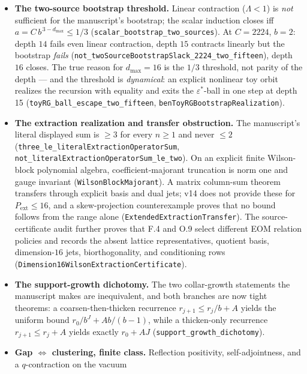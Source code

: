 \documentclass[11pt]{article}
\theoremstyle{definition}
\newcommand{\dmax}{d_{\max}}
\begin{document}
\begin{itemize}
  \item \textbf{The two-source bootstrap threshold.} Linear contraction
    ($\Lambda<1$) is \emph{not} sufficient for the manuscript's bootstrap; the
    scalar induction closes iff $a = C\,b^{\,3-\dmax} \leq 1/3$
    (\texttt{scalar\_bootstrap\_two\_sources}). At $C=2224$, $b=2$: depth $14$
    fails even linear contraction, depth $15$ contracts linearly but the
    bootstrap \emph{fails}
    (\texttt{not\_twoSourceBootstrapSlack\_2224\_two\_fifteen}), depth $16$
    closes. The true reason for $\dmax=16$ is the $1/3$ threshold, not parity of
    the depth --- and the threshold is \emph{dynamical}: an explicit nonlinear
    toy orbit realizes the recursion with equality and exits the
    $\varepsilon^{*}$-ball in one step at depth 15
    (\texttt{toyRG\_ball\_escape\_two\_fifteen},
    \texttt{benToyRGBootstrapRealization}).
  \item \textbf{The extraction realization and transfer obstruction.} The
    manuscript's literal displayed sum is $\geq 3$ for every
    $n\geq 1$ and never $\leq 2$
    (\texttt{three\_le\_literalExtractionOperatorSum},
    \texttt{not\_literalExtractionOperatorSum\_le\_two}). On an explicit
    finite Wilson-block polynomial algebra, coefficient-majorant truncation is
    norm one and gauge invariant (\texttt{WilsonBlockMajorant}). A matrix
    column-sum theorem transfers through explicit basis and dual jets; v14 does
    not provide these for $P_{\mathrm{ext}}\leq16$, and a skew-projection
    counterexample proves that no bound follows from the range alone
    (\texttt{ExtendedExtractionTransfer}). The source-certificate audit further
    proves that F.4 and O.9 select different EOM relation policies and records
    the absent lattice representatives, quotient basis, dimension-$16$ jets,
    biorthogonality, and conditioning rows
    (\texttt{Dimension16WilsonExtractionCertificate}).
  \item \textbf{The support-growth dichotomy.} The two collar-growth statements
    the manuscript makes are inequivalent, and both branches are now tight
    theorems: a coarsen-then-thicken recurrence $r_{j+1}\leq r_j/b + A$ yields
    the uniform bound $r_0/b^{J} + Ab/(b-1)$, while a thicken-only recurrence
    $r_{j+1}\leq r_j + A$ yields exactly $r_0 + AJ$
    (\texttt{support\_growth\_dichotomy}).
  \item \textbf{Gap $\Leftrightarrow$ clustering, finite class.} Reflection
    positivity, self-adjointness, and a $q$-contraction on the vacuum

\end{itemize}
\end{document}
